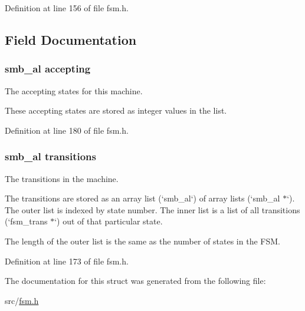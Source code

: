 \-Definition at line 156 of file fsm.\-h.



\subsection{\-Field \-Documentation}
\hypertarget{structfsm_a1b0a524350f2fa9bf19b3e3b35c20ff5}{
\subsubsection[{accepting}]{\setlength{\rightskip}{0pt plus 5cm}smb\-\_\-al {\bf accepting}}}\label{structfsm_a1b0a524350f2fa9bf19b3e3b35c20ff5}


\-The accepting states for this machine. 

\-These accepting states are stored as integer values in the list. 

\-Definition at line 180 of file fsm.\-h.

\hypertarget{structfsm_a22fef7588d41534fabaa8def82aabb2e}{
\subsubsection[{transitions}]{\setlength{\rightskip}{0pt plus 5cm}smb\-\_\-al {\bf transitions}}}\label{structfsm_a22fef7588d41534fabaa8def82aabb2e}


\-The transitions in the machine. 

\-The transitions are stored as an array list (`smb\-\_\-al`) of array lists (`smb\-\_\-al $\ast$`). \-The outer list is indexed by state number. \-The inner list is a list of all transitions (`fsm\-\_\-trans $\ast$`) out of that particular state.

\-The length of the outer list is the same as the number of states in the \-F\-S\-M. 

\-Definition at line 173 of file fsm.\-h.



\-The documentation for this struct was generated from the following file\-:\begin{DoxyCompactItemize}
\item 
src/\hyperlink{fsm_8h}{fsm.\-h}\end{DoxyCompactItemize}
